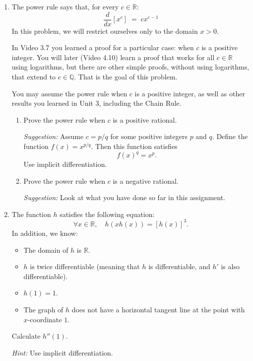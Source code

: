 \documentclass[12pt]{exam}
\newcommand {\DS} [1] {${\displaystyle #1}$}
\newcommand{\vv}{\vspace{.4cm}}
\newcommand{\R}{\mathbb{R}}
\newcommand{\Q}{\mathbb{Q}}
\begin{document}
\begin{enumerate}[resume]
\newpage

\item \label{qu:power}  The power rule says that, for every $c \in \R$:
	$$
		\frac{d}{dx} \left[ x^c \right]  \; = \; c x^{c-1}
	$$
In this problem, we will restrict ourselves only to the domain $x>0$.

In Video 3.7 you learned a proof for a particular case: when $c$ is a positive integer.  You will later (Video 4.10) learn a proof that works for all $c \in \R$ using logarithms, but there are other simple proofs, without using logarithms, that extend to $c \in \Q$.  That is the goal of this problem.
	
You may assume the power rule when $c$ is a positive integer, as well as other results you learned in Unit 3, including the Chain Rule.
	\begin{enumerate}
		\item  Prove the power rule when $c$ is a positive rational.
		
		\emph{Suggestion:}  Assume $c=p/q$ for some positive integers $p$ and $q$.    Define the function $f(x)=x^{p/q}$.  Then this function satisfies
			$$
				f(x)^q = x^p.
			$$
			Use implicit differentiation.
		
		\item  Prove the power rule when $c$ is a negative rational.
		
		\emph{Suggestion:} Look at what you have done so far in this assignment.
	\end{enumerate}

\vv
\newpage

\item   The function $h$ satisfies the following equation:
	$$ \forall x \in \R, \quad h(xh(x)) = \left[ h(x)\right]^3. $$
In addition, we know:
	\begin{itemize}
		\item The domain of $h$ is $\R$.
		\item $h$ is twice differentiable (meaning that $h$ is differentiable, and $h'$ is also differentiable).
		\item $h(1)=1$.
		\item The graph of $h$ does not have a horizontal tangent line at the point with $x$-coordinate $1$.
	\end{itemize}
	
	Calculate \DS{h''(1)}.
	
	\emph{Hint:} Use implicit differentiation.


\end{enumerate}
\end{document}
